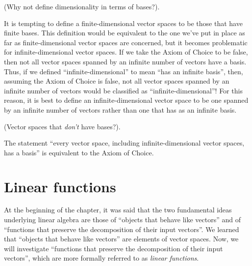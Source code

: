 \begin{remark}
    (Why not define dimensionality in terms of bases?). 
    
    It is tempting to define a finite-dimensional vector spaces to be those that have finite bases. This definition would be equivalent to the one we've put in place as far as finite-dimensional vector spaces are concerned, but it becomes problematic for infinite-dimensional vector spaces. If we take the Axiom of Choice to be false, then not all vector spaces spanned by an infinite number of vectors have a basis. Thus, if we defined ``infinite-dimensional'' to mean ``has an infinite basis'', then, assuming the Axiom of Choice is false, not all vector spaces spanned by an infinite number of vectors would be classified as ``infinite-dimensional''! For this reason, it is best to define an infinite-dimensional vector space to be one spanned by an infinite number of vectors rather than one that has as an infinite basis.
\end{remark}

\begin{remark}
    (Vector spaces that \textit{don't} have bases?).
    
    The statement ``every vector space, including infinite-dimensional vector spaces, has a basis'' is equivalent to the Axiom of Choice.
\end{remark}

\newpage

\section{Linear functions}

At the beginning of the chapter, it was said that the two fundamental ideas underlying linear algebra are those of ``objects that behave like vectors'' and of ``functions that preserve the decomposition of their input vectors''. We learned that ``objects that behave like vectors'' are elements of vector spaces. Now, we will investigate ``functions that preserve the decomposition of their input vectors'', which are more formally referred to as \textit{linear functions}.

